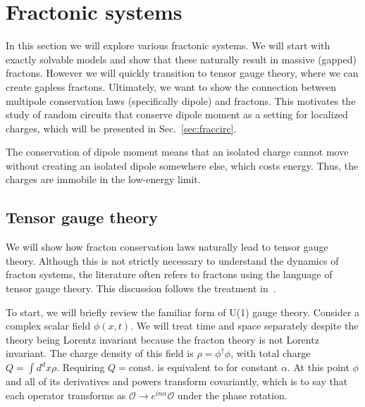\documentclass[a4paper,12pt]{article}
\newcommand{\note}[1]{{\color{red}{#1}}}
\begin{document}
\section{Fractonic systems} \label{sec:frac}

In this section we will explore various fractonic systems. We will start with exactly solvable models and show that these naturally result in massive (gapped) fractons. However we will quickly transition to tensor gauge theory, where we can create gapless fractons. Ultimately, we want to show the connection between multipole conservation laws (specifically dipole) and fractons. This motivates the study of random circuits that conserve dipole moment as a setting for localized charges, which will be presented in Sec.~\ref{sec:fraccirc}.

The conservation of dipole moment means that an isolated charge cannot move without creating an isolated dipole somewhere else, which costs energy. Thus, the charges are immobile in the low-energy limit. 

\subsection{Tensor gauge theory} \label{sub:tensor}

We will show how fracton conservation laws naturally lead to tensor gauge theory. Although this is not strictly necessary to understand the dynamics of fracton systems, the literature often refers to fractons using the language of tensor gauge theory. This discussion follows the treatment in~\cite{PretkoFractonGauge}. 

To start, we will briefly review the familiar form of U(1) gauge theory. Consider a complex scalar field $\phi(x,t)$. We will treat time and space separately despite the theory being Lorentz invariant because the fracton theory is not Lorentz invariant. The charge density of this field is $\rho =\phi^\dag\phi$, with total charge $Q=\int d^dx \rho$. Requiring $Q=\text{const.}$ is equivalent to \note{requiring
\begin{align}
\phi\to e^{i\alpha}\phi
\end{align}	
be a symmetry of the theory,} for constant $\alpha$. At this point $\phi$ and all of its derivatives and powers transform covariantly, which is to say that each operator transforms as $\mathcal{O}\to e^{in\alpha}\mathcal{O}$ under the phase rotation.
\end{document}
